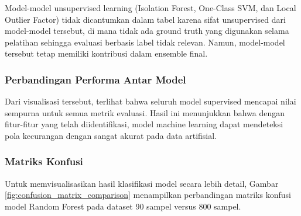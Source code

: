 Model-model unsupervised learning (Isolation Forest, One-Class SVM, dan Local Outlier Factor) tidak dicantumkan dalam tabel karena sifat unsupervised dari model-model tersebut, di mana tidak ada ground truth yang digunakan selama pelatihan sehingga evaluasi berbasis label tidak relevan. Namun, model-model tersebut tetap memiliki kontribusi dalam ensemble final.

\subsubsection{Perbandingan Performa Antar Model}



Dari visualisasi tersebut, terlihat bahwa seluruh model supervised mencapai nilai sempurna untuk semua metrik evaluasi. Hasil ini menunjukkan bahwa dengan fitur-fitur yang telah diidentifikasi, model machine learning dapat mendeteksi pola kecurangan dengan sangat akurat pada data artifisial.

\subsubsection{Matriks Konfusi}

Untuk memvisualisasikan hasil klasifikasi model secara lebih detail, Gambar \ref{fig:confusion_matrix_comparison} menampilkan perbandingan matriks konfusi model Random Forest pada dataset 90 sampel versus 800 sampel.

